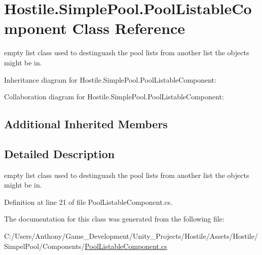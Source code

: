 \hypertarget{class_hostile_1_1_simple_pool_1_1_pool_listable_component}{\section{Hostile.\-Simple\-Pool.\-Pool\-Listable\-Component Class Reference}
\label{class_hostile_1_1_simple_pool_1_1_pool_listable_component}
}


empty list class used to destinguash the pool lists from another list the objects might be in.  




Inheritance diagram for Hostile.\-Simple\-Pool.\-Pool\-Listable\-Component\-:


Collaboration diagram for Hostile.\-Simple\-Pool.\-Pool\-Listable\-Component\-:
\subsection*{Additional Inherited Members}


\subsection{Detailed Description}
empty list class used to destinguash the pool lists from another list the objects might be in. 

Definition at line 21 of file Pool\-Listable\-Component.\-cs.



The documentation for this class was generated from the following file\-:\begin{DoxyCompactItemize}
\item 
C\-:/\-Users/\-Anthony/\-Game\-\_\-\-Development/\-Unity\-\_\-\-Projects/\-Hostile/\-Assets/\-Hostile/\-Simpel\-Pool/\-Components/\hyperlink{_pool_listable_component_8cs}{Pool\-Listable\-Component.\-cs}\end{DoxyCompactItemize}
